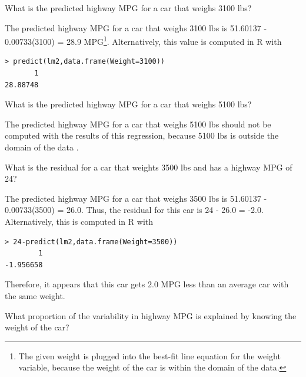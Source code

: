 \documentclass[10pt,openany]{book}\usepackage[]{graphicx}\usepackage[]{color}
\makeatletter
\newenvironment{kframe}{%
 \def\at@end@of@kframe{}%
 \ifinner\ifhmode%
  \def\at@end@of@kframe{\end{minipage}}%
  \begin{minipage}{\columnwidth}%
 \fi\fi%
 \def\FrameCommand##1{\hskip\@totalleftmargin \hskip-\fboxsep
 \colorbox{shadecolor}{##1}\hskip-\fboxsep
     \hskip-\linewidth \hskip-\@totalleftmargin \hskip\columnwidth}%
 \MakeFramed {\advance\hsize-\width
   \@totalleftmargin\z@ \linewidth\hsize
   \@setminipage}}%
 {\par\unskip\endMakeFramed%
 \at@end@of@kframe}
\newenvironment{knitrout}{}{} %
\makeatother
\begin{document}
\begin{QAlist}
\begin{QAlist}
  \end{QAlist}
  \item What is the predicted highway MPG for a car that weighs 3100 lbs?
  \begin{QAlist}
    \item The predicted highway MPG for a car that weighs 3100 lbs is 51.60137 - 0.00733(3100) = 28.9 MPG\footnote{The given weight is plugged into the best-fit line equation for the weight variable, because the weight of the car is within the domain of the data.}.  Alternatively, this value is computed in R with
\begin{knitrout}
\color{fgcolor}\begin{kframe}
\begin{verbatim}
> predict(lm2,data.frame(Weight=3100))
       1 
28.88748 
\end{verbatim}
\end{kframe}
\end{knitrout}
  \end{QAlist}
  \item What is the predicted highway MPG for a car that weighs 5100 lbs?
  \begin{QAlist}
    \item The predicted highway MPG for a car that weighs 5100 lbs should not be computed with the results of this regression, because 5100 lbs is outside the domain of the data .
  \end{QAlist}
  \item What is the residual for a car that weights 3500 lbs and has a highway MPG of 24?
  \begin{QAlist}
    \item The predicted highway MPG for a car that weighs 3500 lbs is 51.60137 - 0.00733(3500) = 26.0.  Thus, the residual for this car is 24 - 26.0 = -2.0.  Alternatively, this is computed in R with
\begin{knitrout}
\color{fgcolor}\begin{kframe}
\begin{verbatim}
> 24-predict(lm2,data.frame(Weight=3500))
        1 
-1.956658 
\end{verbatim}
\end{kframe}
\end{knitrout}
Therefore, it appears that this car gets 2.0 MPG less than an average car with the same weight.
  \end{QAlist}
  \item What proportion of the variability in highway MPG is explained by knowing the weight of the car?

\end{QAlist}
\end{document}
